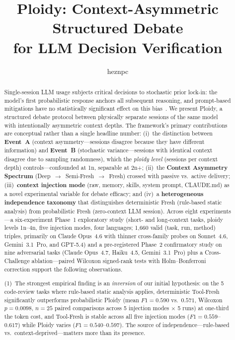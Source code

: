 \documentclass[11pt]{article}
\title{Ploidy: Context-Asymmetric Structured Debate\\for LLM Decision Verification}
\author{heznpc}
\date{}
\begin{document}
\maketitle

\begin{abstract}
Single-session LLM usage subjects critical decisions to stochastic prior lock-in: the model's first probabilistic response anchors all subsequent reasoning, and prompt-based mitigations have no statistically significant effect on this bias~\citep{feng2026anchoring}. We present Ploidy, a structured debate protocol between physically separate sessions of the same model with intentionally asymmetric context depths. The framework's primary contributions are conceptual rather than a single headline number: (i)~the distinction between \textbf{Event~A} (context asymmetry---sessions disagree because they have different information) and \textbf{Event~B} (stochastic variance---sessions with identical context disagree due to sampling randomness), which the \emph{ploidy level} (sessions per context depth) controls---confounded at 1n, separable at 2n+; (ii)~the \textbf{Context Asymmetry Spectrum} (Deep~$\to$~Semi-Fresh~$\to$~Fresh) crossed with passive vs.\ active delivery; (iii)~\textbf{context injection mode} (raw, memory, skills, system prompt, CLAUDE.md) as a novel experimental variable for debate efficacy; and (iv)~a \textbf{heterogeneous independence taxonomy} that distinguishes deterministic Fresh (rule-based static analysis) from probabilistic Fresh (zero-context LLM session). Across eight experiments---a six-experiment Phase~1 exploratory study (short- and long-context tasks, ploidy levels 1n--4n, five injection modes, four languages; 1{,}660 valid (task, run, method) triples, primarily on Claude Opus~4.6 with thinner cross-family probes on Sonnet~4.6, Gemini~3.1~Pro, and GPT-5.4) and a pre-registered Phase~2 confirmatory study on nine adversarial tasks (Claude Opus~4.7, Haiku~4.5, Gemini~3.1~Pro) plus a Cross-Challenge ablation---paired Wilcoxon signed-rank tests with Holm--Bonferroni correction support the following observations.

\noindent (1)~The strongest empirical finding is an \emph{inversion} of our initial hypothesis: on the 5 code-review tasks where rule-based static analysis applies, deterministic Tool-Fresh significantly outperforms probabilistic Ploidy (mean $F1 = 0.590$ vs.\ $0.571$, Wilcoxon $p = 0.0098$, $n = 25$ paired comparisons across 5 injection modes $\times$ 5 runs) at one-third the token cost, and Tool-Fresh is stable across all five injection modes ($F1 = 0.559$--$0.617$) while Ploidy varies ($F1 = 0.540$--$0.597$). The source of independence---rule-based vs.\ context-deprived---matters more than its presence.


\end{abstract}
\end{document}
